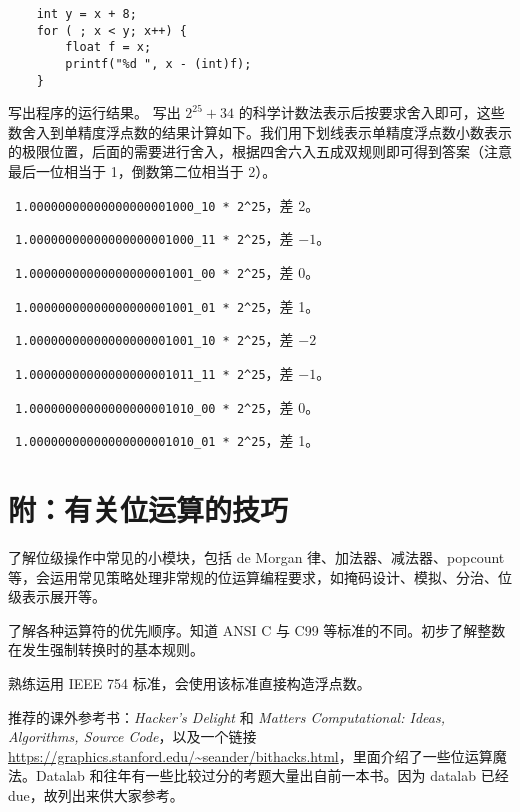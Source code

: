 \begin{problems}
\begin{verbatim}
    int y = x + 8;
    for ( ; x < y; x++) {
        float f = x;
        printf("%d ", x - (int)f);
    }
        \end{verbatim}
        写出程序的运行结果。
        \sol 写出 $2^{25}+34$ 的科学计数法表示后按要求舍入即可，这些数舍入到单精度浮点数的结果计算如下。我们用下划线表示单精度浮点数小数表示的极限位置，后面的需要进行舍入，根据四舍六入五成双规则即可得到答案（注意最后一位相当于 1，倒数第二位相当于 2）。
        \begin{compactenum}
            \item \ \verb|1.00000000000000000001000_10 * 2^25|，差 2。
            \item \ \verb|1.00000000000000000001000_11 * 2^25|，差 $-1$。
            \item \ \verb|1.00000000000000000001001_00 * 2^25|，差 0。
            \item \ \verb|1.00000000000000000001001_01 * 2^25|，差 1。
            \item \ \verb|1.00000000000000000001001_10 * 2^25|，差 $-2$
            \item \ \verb|1.00000000000000000001011_11 * 2^25|，差 $-1$。
            \item \ \verb|1.00000000000000000001010_00 * 2^25|，差 0。
            \item \ \verb|1.00000000000000000001010_01 * 2^25|，差 1。
        \end{compactenum}
    \end{problems}

    \section*{附：有关位运算的技巧}
    \begin{summary}
        \begin{compactitem}
            \item 了解位级操作中常见的小模块，包括 de Morgan 律、加法器、减法器、popcount 等，会运用常见策略处理非常规的位运算编程要求，如掩码设计、模拟、分治、位级表示展开等。
            \item 了解各种运算符的优先顺序。知道 ANSI C 与 C99 等标准的不同。初步了解整数在发生强制转换时的基本规则。
            \item 熟练运用 IEEE 754 标准，会使用该标准直接构造浮点数。
            \item 推荐的课外参考书：\textit{Hacker's Delight} 和 \textit{Matters Computational: Ideas, Algorithms, Source Code}，以及一个链接 \url{https://graphics.stanford.edu/~seander/bithacks.html}，里面介绍了一些位运算魔法。Datalab 和往年有一些比较过分的考题大量出自前一本书。因为 datalab 已经 due，故列出来供大家参考。
        \end{compactitem}
    \end{summary}

